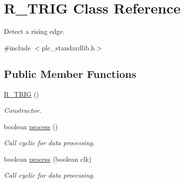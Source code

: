 \hypertarget{class_r___t_r_i_g}{\section{R\+\_\+\+T\+R\+I\+G Class Reference}
\label{class_r___t_r_i_g}
}


Detect a rising edge.  




{\ttfamily \#include $<$plc\+\_\+standardlib.\+h$>$}

\subsection*{Public Member Functions}
\begin{DoxyCompactItemize}
\item 
\hypertarget{class_r___t_r_i_g_af37e2db08790615bac8ba59f67951bb9}{\hyperlink{class_r___t_r_i_g_af37e2db08790615bac8ba59f67951bb9}{R\+\_\+\+T\+R\+I\+G} ()}\label{class_r___t_r_i_g_af37e2db08790615bac8ba59f67951bb9}

\begin{DoxyCompactList}\small\item\em Constructor. \end{DoxyCompactList}\item 
\hypertarget{class_r___t_r_i_g_af0d63ce4f3a41989ff127e0d52f038e3}{boolean \hyperlink{class_r___t_r_i_g_af0d63ce4f3a41989ff127e0d52f038e3}{process} ()}\label{class_r___t_r_i_g_af0d63ce4f3a41989ff127e0d52f038e3}

\begin{DoxyCompactList}\small\item\em Call cyclic for data processing. \end{DoxyCompactList}\item 
boolean \hyperlink{class_r___t_r_i_g_af2a831b21b80656cd4e25585d940805e}{process} (boolean clk)
\begin{DoxyCompactList}\small\item\em Call cyclic for data processing. \end{DoxyCompactList}\end{DoxyCompactItemize}
